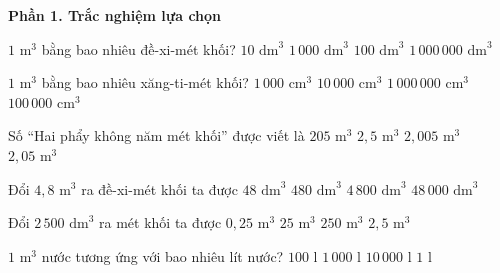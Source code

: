 \textbf{Phần 1. Trắc nghiệm lựa chọn}

\begin{ex} %
$1\text{ m}^3$ bằng bao nhiêu đề-xi-mét khối?
\choice
{$10\text{ dm}^3$}
{\True $1\,000\text{ dm}^3$}
{$100\text{ dm}^3$}
{$1\,000\,000\text{ dm}^3$}
\end{ex}

\begin{ex} %
$1\text{ m}^3$ bằng bao nhiêu xăng-ti-mét khối?
\choice
{$1\,000\text{ cm}^3$}
{$10\,000\text{ cm}^3$}
{\True $1\,000\,000\text{ cm}^3$}
{$100\,000\text{ cm}^3$}
\end{ex}

\begin{ex} %
Số “Hai phẩy không năm mét khối” được viết là
\choice
{$205\text{ m}^3$}
{$2{,}5\text{ m}^3$}
{$2{,}005\text{ m}^3$}
{\True $2{,}05\text{ m}^3$}
\end{ex}

\begin{ex} %
Đổi $4{,}8\text{ m}^3$ ra đề-xi-mét khối ta được
\choice
{$48\text{ dm}^3$}
{$480\text{ dm}^3$}
{\True $4\,800\text{ dm}^3$}
{$48\,000\text{ dm}^3$}
\end{ex}

\begin{ex} %
Đổi $2\,500\text{ dm}^3$ ra mét khối ta được
\choice
{$0{,}25\text{ m}^3$}
{$25\text{ m}^3$}
{$250\text{ m}^3$}
{\True $2{,}5\text{ m}^3$}
\end{ex}

\begin{ex} %
$1\text{ m}^3$ nước tương ứng với bao nhiêu lít nước?
\choice
{$100\text{ l}$}
{\True $1\,000\text{ l}$}
{$10\,000\text{ l}$}
{$1\text{ l}$}
\end{ex}

